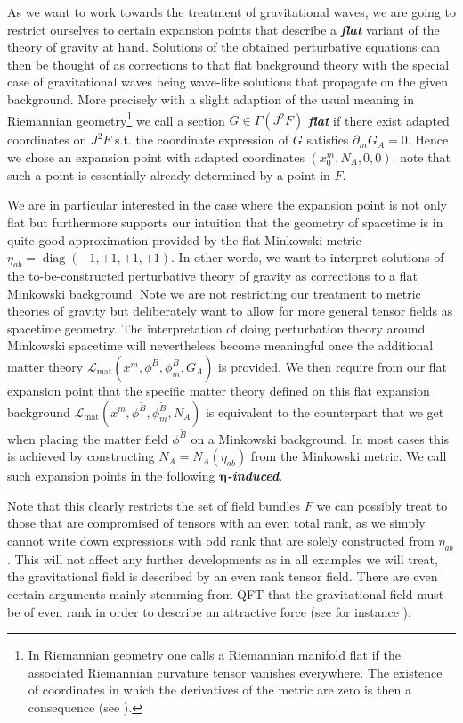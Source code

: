 As we want to work towards the treatment of gravitational waves, we are going to restrict ourselves to certain expansion points that describe a \textit{\textbf{flat}} variant of the theory of gravity at hand. Solutions of the obtained perturbative equations can then be thought of as corrections to that flat background theory with the special case of gravitational waves being wave-like solutions that propagate on the given background. More precisely with a slight adaption of the usual meaning in Riemannian geometry\footnote{In Riemannian geometry one calls a Riemannian manifold flat if the associated Riemannian curvature tensor vanishes everywhere. The existence of coordinates in which the derivatives of the metric are zero is then a consequence (see \cite{petersen2006riemannian}).} we call a section $G \in \Gamma(J^2F)$ \textit{\textbf{flat}} if there exist adapted coordinates on $J^2F$ s.t. the coordinate expression of $G$ satisfies $\partial_mG_{A}=0$.
Hence we chose an expansion point with adapted coordinates $(x_0^m,N_A,0,0)$. note that such a point is essentially already determined by a point in $F$. 

We are in particular interested in the case where the expansion point is not only flat but furthermore supports our intuition that the geometry of spacetime is in quite good approximation provided by the flat Minkowski metric $\eta_{ab} = \operatorname{diag}(-1,+1,+1,+1)$. 
%
%
In other words, we want to interpret solutions of the to-be-constructed perturbative theory of gravity as corrections to a flat Minkowski background. Note we are not restricting our treatment to metric theories of gravity but deliberately want to allow for more general tensor fields as spacetime geometry.
The interpretation of doing perturbation theory around Minkowski spacetime will nevertheless become meaningful once the additional matter theory $\mathcal{L}_{\text{mat}}(x^m,\phi^{\tilde{B}},\phi^{\tilde{B}}_m,G_A)$ is provided. We then require from our flat expansion point that the specific matter theory defined on this flat expansion background $\mathcal{L}_{\text{mat}}(x^m,\phi^{\tilde{B}},\phi^{\tilde{B}}_m,N_A)$ is equivalent to the counterpart that we get when placing the matter field $\phi^{\tilde{B}}$ on a Minkowski background. 
In most cases this is achieved by constructing $N_A = N_A(\eta_{ab})$ from the Minkowski metric. We call such expansion points in the following \textit{\textbf{$\boldsymbol{\eta}$-induced}}.

Note that this clearly restricts the set of field bundles $F$ we can possibly treat to those that are compromised of tensors with an even total rank, as we simply cannot write down expressions with odd rank that are solely constructed from $\eta_{ab}$. This will not affect any further developments as in all examples we will treat, the gravitational field is described by an even rank tensor field. There are even certain arguments mainly stemming from QFT that the gravitational field must be of even rank in order to describe an attractive force (see for instance \cite{vecchiato2017variational}). 

